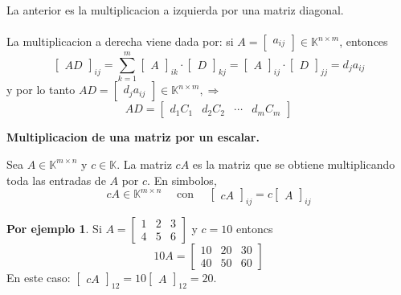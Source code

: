 \documentclass{article}
\theoremstyle{definition}
\theoremstyle{definition}
\newtheorem*{ej}{Por ejemplo}
\theoremstyle{remark}
\begin{document}
La anterior es la multiplicacion a izquierda por una matriz diagonal.\\\\
La multiplicacion a derecha viene dada por: si $A=\begin{bmatrix}a_{ij} \end{bmatrix} \in \mathbb{K}^{n \times m}$, entonces \[
\begin{bmatrix} AD \end{bmatrix}_{ij} = \sum_{k=1}^{m} \begin{bmatrix}A \end{bmatrix}_{ik} \cdot \begin{bmatrix}D \end{bmatrix}_{kj} = \begin{bmatrix} A \end{bmatrix}_{ij} \cdot \begin{bmatrix} D \end{bmatrix}_{jj}=d_j a_{ij}
\]y por lo tanto $AD = \begin{bmatrix}d_ja_{ij} \end{bmatrix} \in \mathbb{K}^{n \times m}, \Rightarrow$ \[
AD=\begin{bmatrix}d_1C_1 & d_2 C_2 & \cdots & d_mC_m\end{bmatrix}
\]
\begin{center}
\textbf{Multiplicacion de una matriz por un escalar.}
\end{center}
Sea $A \in \mathbb{K}^{m \times n}$ y $c \in \mathbb{K}$. La matriz $cA$ es la matriz que se obtiene multiplicando toda las entradas de $A$ por $c$. En simbolos, \[
  cA \in \mathbb{K}^{m \times n} \quad \text{ con } \quad \begin{bmatrix}cA\end{bmatrix}_{ij}=c\begin{bmatrix}A\end{bmatrix}_{ij}
\]
\begin{ej}
Si $A = \begin{bmatrix}1 & 2 & 3 \\ 4 & 5 & 6 \end{bmatrix}$ y $c=10$ entoncs \[
10A=\begin{bmatrix}10 & 20 & 30 \\ 40 & 50 & 60 \end{bmatrix}\]
En este caso: $\begin{bmatrix}cA\end{bmatrix}_{12} = 10 \begin{bmatrix}A \end{bmatrix}_{12}=20$.
\end{ej}
\end{document}
